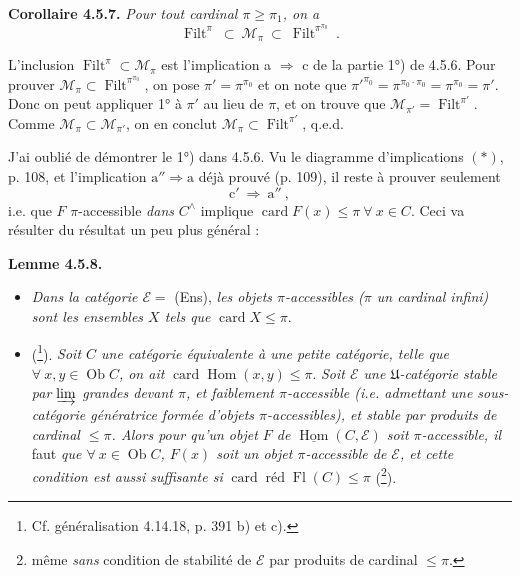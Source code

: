 \documentclass[11pt]{article}
\newcommand{\printedpage}[1]{\marginpar{\footnotesize p.~#1}}
\newcommand{\msp}[1]{\marginpar{\footnotesize [#1]}}
\newcommand{\Filt}{\operatorname{Filt}}
\newcommand{\Ob}{\operatorname{Ob}}
\newcommand{\card}{\operatorname{card}}
\newcommand{\Fl}{\operatorname{Fl}}
\newcommand{\Hom}{\operatorname{Hom}}
\newcommand{\uHom}{\underline{\operatorname{Hom}}}
\begin{document}
\textbf{Corollaire 4.5.7.} \textit{Pour tout cardinal $\pi \geqslant \pi_1$, on a}
\[
\Filt^\pi \ \subset \ \mathcal{M}_\pi \ \subset \ \Filt^{\pi^{\pi_0}} \ . \tag*{(4.5.7.1)}
\]

L'inclusion $\Filt^\pi \subset \mathcal{M}_\pi$ est l'implication a $\Longrightarrow$ c de la partie 1°) de 4.5.6. Pour prouver $\mathcal{M}_\pi \subset \Filt^{\pi^{\pi_0}}$, on pose $\pi' = \pi^{\pi_0}$ et on note que $\pi'^{\pi_0} = \pi^{\pi_0 \cdot \pi_0} = \pi^{\pi_0} = \pi'$. Donc on peut
\printedpage{35}
appliquer 1° à $\pi'$ au lieu de $\pi$, et on trouve que $\mathcal{M}_{\pi'} = \Filt^{\pi'}$. Comme $\mathcal{M}_\pi \subset \mathcal{M}_{\pi'}$, on en conclut $\mathcal{M}_\pi \subset \Filt^{\pi'}$, q.e.d.

J'ai oublié de démontrer le 1°) dans 4.5.6. Vu le diagramme d'implications $(\ast)$, p. 108, et l'implication $\mathrm{a}'' \Longrightarrow \mathrm{a}$ déjà prouvé (p. 109),
\msp{page 119}
il reste à prouver seulement
\[
\mathrm{c}' \ \Longrightarrow \ \mathrm{a}'' \ ,
\]
i.e. que $F$ $\pi$-accessible \textit{dans} $C^\wedge$ implique $\card F(x) \leqslant \pi \ \forall \ x \in C$. Ceci va résulter du résultat un peu plus général :

\textbf{Lemme 4.5.8.}
\begin{itemize}[leftmargin=3em]
\item[\textit{1°)}] \textit{Dans la catégorie $\mathcal{E} = $} (Ens), \textit{les objets $\pi$-accessibles ($\pi$ un cardinal infini) sont les ensembles $X$ tels que} $\card X \leqslant \pi$.
\item[\textit{2°)}] (\footnote{Cf. généralisation 4.14.18, p. 391 b) et c).}). \textit{Soit $C$ une catégorie équivalente à une petite catégorie, telle que $\forall \ x, y \in \Ob C$, on ait} $\card \Hom(x,y) \leqslant \pi$. \textit{Soit $\mathcal{E}$ une $\mathfrak{U}$-catégorie stable par $\varinjlim$ grandes devant $\pi$, et faiblement $\pi$-accessible (i.e. admettant une sous-catégorie génératrice formée d'objets $\pi$-accessibles), et stable par produits de cardinal $\leqslant \pi$. Alors pour qu'un objet $F$ de $\uHom(C,\mathcal{E})$ soit $\pi$-accessible, il} faut \textit{que $\forall \ x \in \Ob C$, $F(x)$ soit un objet $\pi$-accessible de $\mathcal{E}$, et cette condition est aussi suffisante si} $\card \operatorname{\text{réd}} \Fl(C) \leqslant \pi$ (\footnote{même \textit{sans} condition de stabilité de $\mathcal{E}$ par produits de cardinal $\leqslant \pi$.}).
\end{itemize}
\end{document}
